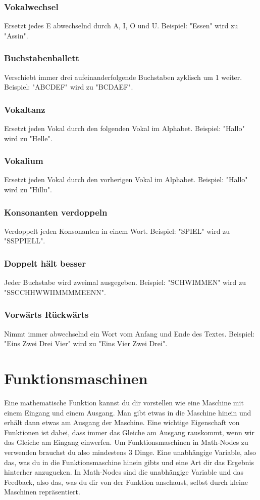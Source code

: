 \documentclass[12pt]{report}
\begin{document}
\subsubsection{Vokalwechsel}
Ersetzt jedes E abwechselnd durch A, I, O und U. Beispiel: "Essen" wird zu "Assin".

\subsubsection{Buchstabenballett}
Verschiebt immer drei aufeinanderfolgende Buchstaben zyklisch um 1 weiter. Beispiel: "ABCDEF" wird zu "BCDAEF".

\subsubsection{Vokaltanz}
Ersetzt jeden Vokal durch den folgenden Vokal im Alphabet. Beispiel: "Hallo" wird zu "Helle".

\subsubsection{Vokalium}
Ersetzt jeden Vokal durch den vorherigen Vokal im Alphabet. Beispiel: "Hallo" wird zu "Hillu".

\subsubsection{Konsonanten verdoppeln}
Verdoppelt jeden Konsonanten in einem Wort. Beispiel: "SPIEL" wird zu "SSPPIELL".

\subsubsection{Doppelt hält besser}
Jeder Buchstabe wird zweimal ausgegeben. Beispiel: "SCHWIMMEN" wird zu "SSCCHHWWIIMMMMEENN".

\subsubsection{Vorwärts Rückwärts}
Nimmt immer abwechselnd ein Wort vom Anfang und Ende des Textes. Beispiel: "Eins Zwei Drei Vier" wird zu "Eins Vier Zwei Drei".

\section{Funktionsmaschinen}
Eine mathematische Funktion kannst du dir vorstellen wie eine Maschine mit einem Eingang und einem Ausgang. Man gibt etwas in die Maschine hinein und erhält dann etwas am Ausgang der Maschine. Eine wichtige Eigenschaft von Funktionen ist dabei, dass immer das Gleiche am Ausgang rauskommt, wenn wir das Gleiche am Eingang einwerfen. Um Funktionsmaschinen in Math-Nodes zu verwenden brauchst du also mindestens 3 Dinge. Eine unabhängige Variable, also das, was du in die Funktionsmaschine hinein gibts und eine Art dir das Ergebnis hinterher anzugucken. In Math-Nodes sind die unabhängige Variable und das Feedback, also das, was du dir von der Funktion anschaust, selbst durch kleine Maschinen repräsentiert. 
\end{document}
